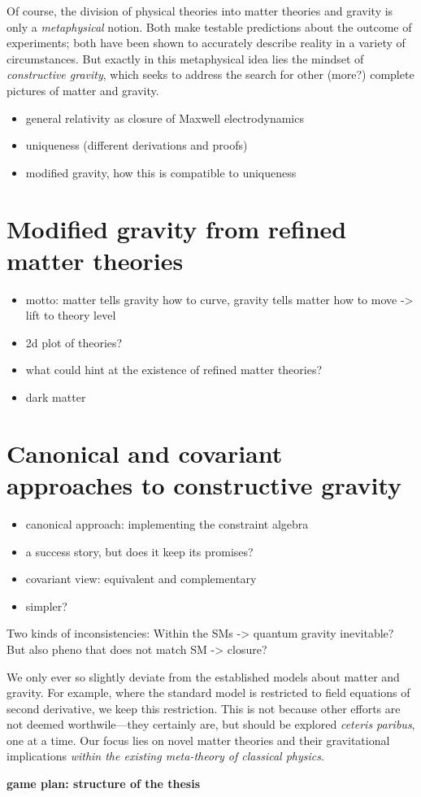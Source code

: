 Of course, the division of physical theories into matter theories and gravity is only a \emph{metaphysical} notion. Both make testable predictions about the outcome of experiments; both have been shown to accurately describe reality in a variety of circumstances. But exactly in this metaphysical idea lies the mindset of \emph{constructive gravity}, which seeks to address the search for other (more?) complete pictures of matter and gravity.

\begin{itemize}
\item general relativity as closure of Maxwell electrodynamics
\item uniqueness (different derivations and proofs)
\item modified gravity, how this is compatible to uniqueness
\end{itemize}

\section{Modified gravity from refined matter theories}

\begin{itemize}
\item motto: matter tells gravity how to curve, gravity tells matter how to move -> lift to theory level
\item 2d plot of theories?
\item what could hint at the existence of refined matter theories?
\item dark matter
\end{itemize}

\section{Canonical and covariant approaches to constructive gravity}

\begin{itemize}
\item canonical approach: implementing the constraint algebra
\item a success story, but does it keep its promises?
\item covariant view: equivalent and complementary
\item simpler?
\end{itemize}

Two kinds of inconsistencies: Within the SMs -> quantum gravity inevitable? But also pheno that does not match SM -> closure?

We only ever so slightly deviate from the established models about matter and gravity. For example, where the standard model is restricted to field equations of second derivative, we keep this restriction. This is not because other efforts are not deemed worthwile---they certainly are, but should be explored \emph{ceteris paribus}, one at a time. Our focus lies on novel matter theories and their gravitational implications \emph{within the existing meta-theory of classical physics}.

\textbf{game plan: structure of the thesis}
